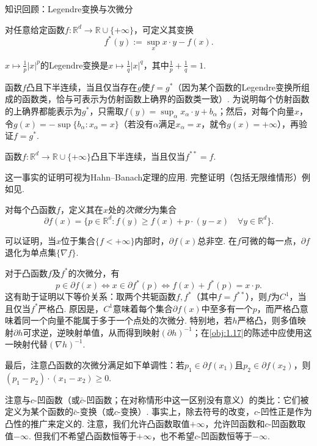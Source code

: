 \begin{sourcebox}{知识回顾：Legendre变换与次微分}\label{box:1.12}
\begin{definition*}
对任意给定函数$f:\mathbb R^d\to\mathbb R\cup\{+\infty\}$，可定义其变换
\[
f^*(y):=\sup_x x\cdot y-f(x).
\]
\end{definition*}
\begin{example*}
$x\mapsto\frac1p|x|^p$的Legendre变换是$x\mapsto\frac1q|x|^q$，其中$\frac1p+\frac1q=1$.
\end{example*}
函数$f$凸且下半连续，当且仅当存在$g$使$f=g^*$（因为某个函数的Legendre变换所组成的函数类，恰与可表示为仿射函数上确界的函数类一致）. 为说明每个仿射函数的上确界都能表示为$g^*$，只需取$f(y)=\sup_\alpha x_\alpha\cdot y+b_\alpha$；然后，对每个向量$x$，令$g(x)=-\sup\{b_\alpha:x_\alpha=x\}$（若没有$\alpha$满足$x_\alpha=x$，就令$g(x)=+\infty$），再验证$f=g^*$.

\begin{proposition*}
函数$f:\mathbb R^d\to\mathbb R\cup\{+\infty\}$凸且下半连续，当且仅当$f^{**}=f$.
\end{proposition*}
这一事实的证明可视为Hahn--Banach定理的应用. 完整证明（包括无限维情形）例如见\cite{b23}.

\begin{definition*}[次微分]
对每个凸函数$f$，定义其在$x$处的\emph{次微分}为集合
\[
\partial f(x)=\{p\in\mathbb R^d:f(y)\ge f(x)+p\cdot(y-x)\quad\forall y\in\mathbb R^d\}.
\]
\end{definition*}
可以证明，当$x$位于集合$\{f<+\infty\}$内部时，$\partial f(x)$总非空. 在$f$可微的每一点，$\partial f$退化为单点集$\{\nabla f\}$.

对于凸函数$f$及$f^*$的次微分，有
\[
p\in\partial f(x)\iff x\in\partial f^*(p)\iff f(x)+f^*(p)=x\cdot p.
\]
这有助于证明以下等价关系：取两个共轭函数$f,f^*$（其中$f=f^{**}$），则$f$为$C^1$，当且仅当$f^*$严格凸. 原因是，$C^1$意味着每个集合$\partial f(x)$中至多有一个$p$，而严格凸意味着同一个向量不能属于多于一个点处的次微分. 特别地，若$h$严格凸，则多值映射$\partial h$可求逆，逆映射单值，从而得到映射$(\partial h)^{-1}$；在\autoref{obj:1.17}的陈述中应使用这一映射代替$(\nabla h)^{-1}$.

最后，注意凸函数的次微分满足如下单调性：若$p_1\in\partial f(x_1)$且$p_2\in\partial f(x_2)$，则$(p_1-p_2)\cdot(x_1-x_2)\ge0$.
\end{sourcebox}

注意与$c$-凹函数（或$\bar c$-凹函数；在对称情形中这一区别没有意义）的类比：它们被定义为某个函数的$\bar c$-变换（或$c$-变换）. 事实上，除去符号的改变，$c$-凹性正是作为凸性的推广来定义的. 注意，我们允许凸函数取值$+\infty$，允许凹函数和$c$-凹函数取值$-\infty$. 但我们不希望凸函数恒等于$+\infty$，也不希望$c$-凹函数恒等于$-\infty$.


